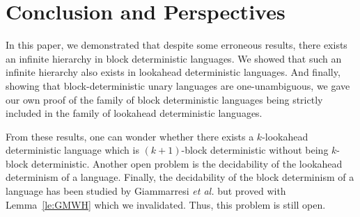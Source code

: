 \documentclass{llncs}
\begin{document}
\section{Conclusion and Perspectives}

In this paper, we demonstrated that despite some erroneous results, there exists an infinite hierarchy in block deterministic languages.
We showed that such an infinite hierarchy also exists in lookahead deterministic languages.
And finally, showing that block-deterministic unary languages are one-unambiguous, we gave our own proof of the family of block deterministic languages being strictly included in the family of lookahead deterministic languages.

From these results, one can wonder whether there exists a $k$-lookahead deterministic language which is $(k+1)$-block deterministic without being $k$-block deterministic.
Another open problem is the decidability of the lookahead determinism of a language.
Finally, the decidability of the block determinism of a language has been studied by Giammarresi \emph{et al.} but proved with Lemma~\ref{le:GMWH} which we invalidated.
Thus, this problem is still open.



\end{document}
